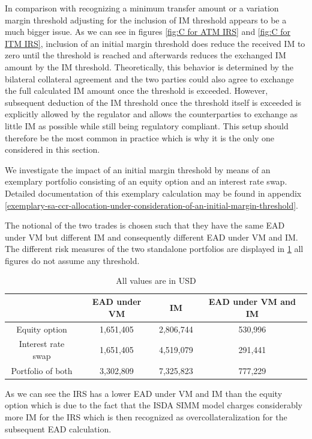 \documentclass[../Thesis_AHoecherl.tex]{subfiles}
\begin{document}
    In comparison with recognizing a minimum transfer amount or a variation margin threshold adjusting for the inclusion of IM threshold appears to be a much bigger issue.
    As we can see in figures \ref{fig:C for ATM IRS} and \ref{fig:C for ITM IRS}, inclusion of an initial margin threshold does reduce the received IM to zero until the threshold is reached and afterwards reduces the exchanged IM amount by the IM threshold.
    Theoretically, this behavior is determined by the bilateral collateral agreement and the two parties could also agree to exchange the full calculated IM amount once the threshold is exceeded.
    However, subsequent deduction of the IM threshold once the threshold itself is exceeded is explicitly allowed by the regulator \cite[Background discussion 2(h)]{BCBS_MarginRequirements} and allows the counterparties to exchange as little IM as possible while still being regulatory compliant.
    This setup should therefore be the most common in practice which is why it is the only one considered in this section.

    We investigate the impact of an initial margin threshold by means of an exemplary portfolio consisting of an equity option and an interest rate swap.
    Detailed documentation of this exemplary calculation may be found in appendix \ref{exemplary-sa-ccr-allocation-under-consideration-of-an-initial-margin-threshold}.

    The notional of the two trades is chosen such that they have the same EAD under VM but different IM and consequently different EAD under VM and IM. 
    The different risk measures of the two standalone portfolios are displayed in \ref{tab:IM threshold example standalone} all figures do not assume any threshold.
    \begin{table}[htbp]
        \centering
        \begin{tabular}{c|c|c|c}
            & EAD under VM & IM & EAD under VM and IM \\
            \toprule
            Equity option & 1,651,405 & 2,806,744 & 530,996 \\
            Interest rate swap& 1,651,405 & 4,519,079 & 291,441 \\
            \midrule
            Portfolio of both& 3,302,809 & 7,325,823 & 777,229 \\
        \end{tabular}%
        \caption{All values are in USD}
        \label{tab:IM threshold example standalone}
    \end{table}
    As we can see the IRS has a lower EAD under VM and IM than the equity option which is due to the fact that the \gls{ISDA SIMM} model charges considerably more IM for the IRS which is then recognized as overcollateralization for the subsequent EAD calculation.
\end{document}
